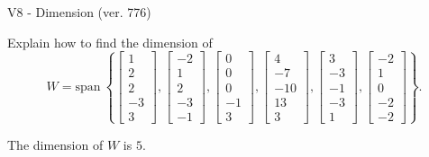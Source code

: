 \begin{exercise}
  \begin{exerciseTitle}V8 - Dimension (ver. 776)\end{exerciseTitle}
  \begin{exerciseStatement}
    Explain how to find the dimension of 
\[W=\mathrm{span}\ \left\{\left[\begin{array}{r}
1 \\
2 \\
2 \\
-3 \\
3
\end{array}\right] , \left[\begin{array}{r}
-2 \\
1 \\
2 \\
-3 \\
-1
\end{array}\right] , \left[\begin{array}{r}
0 \\
0 \\
0 \\
-1 \\
3
\end{array}\right] , \left[\begin{array}{r}
4 \\
-7 \\
-10 \\
13 \\
3
\end{array}\right] , \left[\begin{array}{r}
3 \\
-3 \\
-1 \\
-3 \\
1
\end{array}\right] , \left[\begin{array}{r}
-2 \\
1 \\
0 \\
-2 \\
-2
\end{array}\right]\right\}.\]



  \end{exerciseStatement}
  \begin{exerciseAnswer}
   The dimension of \(W\) is  \(5\).
  


  \end{exerciseAnswer}
\end{exercise}